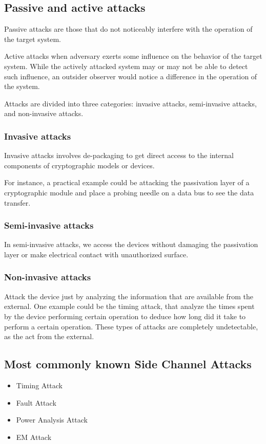\subsection{Passive and active attacks}

Passive attacks are those that do not noticeably interfere with the operation of the target system. 

Active attacks when adversary exerts some influence on the behavior of
the target system. While the actively attacked system may or may not be
able to detect such influence, an outsider observer would notice a
difference in the operation of the system.

Attacks are divided into three categories: invasive attacks, semi-invasive attacks, and non-invasive attacks. 

\subsubsection{Invasive attacks}

Invasive attacks involves de-packaging to get direct access to the internal components of cryptographic models or devices.

For instance, a practical example could be attacking the passivation layer of a cryptographic module and place a probing needle on a data bus to see the data transfer. 

\subsubsection{Semi-invasive attacks}
In semi-invasive attacks, we access the devices without damaging the passivation layer or make electrical contact with unauthorized surface. 

\subsubsection{Non-invasive attacks}
Attack the device just by analyzing the information that are available from the external. 
One example could be the timing attack, that analyze the times spent by the device performing certain operation to deduce how long did it take to perform a certain operation. 
These types of attacks are completely undetectable, as the act from the external. 

\subsection{Most commonly known Side Channel Attacks}
\begin{itemize}
    \item Timing Attack
    \item Fault Attack
    \item Power Analysis Attack 
    \item EM Attack 
\end{itemize}

